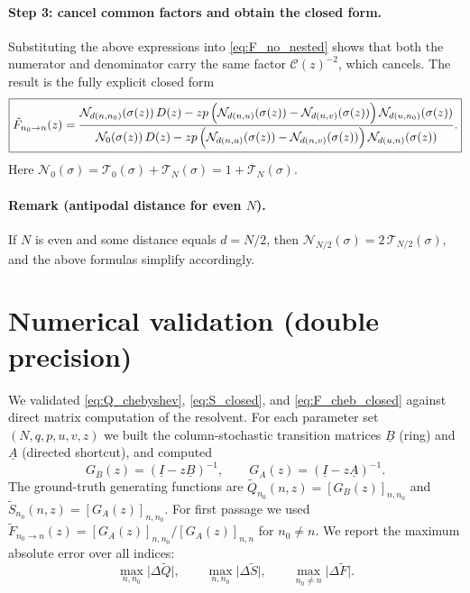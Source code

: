 \documentclass[11pt]{article}
\newcommand{\T}{\mathcal{T}}
\begin{document}
\paragraph{Step 3: cancel common factors and obtain the closed form.}
Substituting the above expressions into \eqref{eq:F_no_nested} shows that both the numerator and denominator carry the same factor $\mathcal{C}(z)^{-2}$, which cancels.
The result is the fully explicit closed form
\begin{equation}
\boxed{
\tilde F_{n_0\to n}(z)=
\frac{
\mathcal{N}_{d(n,n_0)}(\sigma(z))\,D(z)
-z p\,\Bigl(\mathcal{N}_{d(n,u)}(\sigma(z))-\mathcal{N}_{d(n,v)}(\sigma(z))\Bigr)\,\mathcal{N}_{d(u,n_0)}(\sigma(z))
}{
\mathcal{N}_{0}(\sigma(z))\,D(z)
-z p\,\Bigl(\mathcal{N}_{d(n,u)}(\sigma(z))-\mathcal{N}_{d(n,v)}(\sigma(z))\Bigr)\,\mathcal{N}_{d(u,n)}(\sigma(z))
}.
}
\label{eq:F_cheb_closed}
\end{equation}
Here $\mathcal{N}_0(\sigma)=\T_0(\sigma)+\T_N(\sigma)=1+\T_N(\sigma)$.

\paragraph{Remark (antipodal distance for even $N$).}
If $N$ is even and some distance equals $d=N/2$, then $\mathcal{N}_{N/2}(\sigma)=2\,\T_{N/2}(\sigma)$, and the above formulas simplify accordingly.

\section*{Numerical validation (double precision)}

We validated \eqref{eq:Q_chebyshev}, \eqref{eq:S_closed}, and \eqref{eq:F_cheb_closed} against direct matrix computation of the resolvent.
For each parameter set $(N,q,p,u,v,z)$ we built the column-stochastic transition matrices $\underline{B}$ (ring) and $\underline{A}$ (directed shortcut),
and computed
\[
G_B(z)=(\underline{I}-z\underline{B})^{-1},\qquad
G_A(z)=(\underline{I}-z\underline{A})^{-1}.
\]
The ground-truth generating functions are $\tilde Q_{n_0}(n,z)=[G_B(z)]_{n,n_0}$ and $\tilde S_{n_0}(n,z)=[G_A(z)]_{n,n_0}$.
For first passage we used $\tilde F_{n_0\to n}(z)=[G_A(z)]_{n,n_0}/[G_A(z)]_{n,n}$ for $n_0\neq n$.
We report the maximum absolute error over all indices:
\[
\max_{n,n_0}\bigl|\Delta\tilde Q\bigr|,\qquad
\max_{n,n_0}\bigl|\Delta\tilde S\bigr|,\qquad
\max_{n_0\neq n}\bigl|\Delta\tilde F\bigr|.
\]
\end{document}
